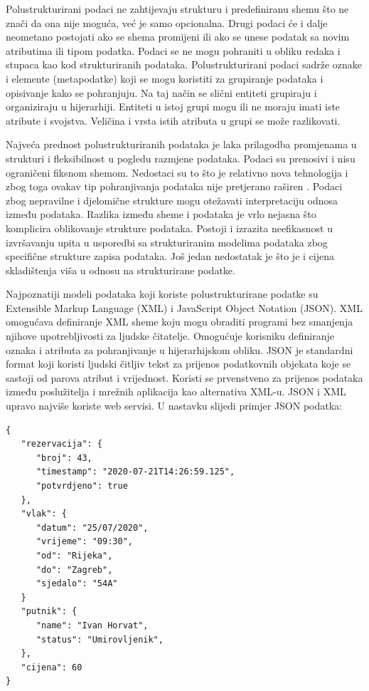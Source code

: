 \documentclass{foi}
\begin{document}
Polustrukturirani podaci ne zahtijevaju strukturu i predefiniranu shemu što ne znači da ona nije moguća, već je samo opcionalna. Drugi podaci će i dalje neometano postojati ako se shema promijeni ili ako se unese podatak sa novim atributima ili tipom podatka. Podaci se ne mogu pohraniti u obliku redaka i stupaca kao kod strukturiranih podataka. Polustrukturirani podaci sadrže oznake i elemente (metapodatke) koji se mogu koristiti za grupiranje podataka i opisivanje kako se pohranjuju. Na taj način se slični entiteti grupiraju i organiziraju u hijerarhiji. Entiteti u istoj grupi mogu ili ne moraju imati iste atribute i svojstva. Veličina i vrsta istih atributa u grupi se može razlikovati.

Najveća prednost polustrukturiranih podataka je laka prilagodba promjenama u strukturi i fleksibilnost u pogledu razmjene podataka. Podaci su prenosivi i nisu ograničeni fiksnom shemom. Nedostaci su to što je relativno nova tehnologija i zbog toga ovakav tip pohranjivanja podataka nije pretjerano raširen \cite{unstructuredStructuredSemiStructured}. Podaci zbog nepravilne i djelomične strukture mogu otežavati interpretaciju odnosa između podataka. Razlika između sheme i podataka je vrlo nejasna što komplicira oblikovanje strukture podataka. Postoji i izrazita neefikasnost u izvršavanju upita u usporedbi sa strukturiranim modelima podataka zbog specifične strukture zapisa podataka. Još jedan nedostatak je što je i cijena skladištenja viša u odnosu na strukturirane podatke. \cite{tbpknjiga}

Najpoznatiji modeli podataka koji koriste polustrukturirane podatke su Extensible Markup Language (XML) i JavaScript Object Notation (JSON). XML omogućava definiranje XML sheme koju mogu obraditi programi bez smanjenja njihove upotrebljivosti za ljudske čitatelje. Omogućuje korisniku definiranje oznaka i atributa za pohranjivanje u hijerarhijskom obliku. JSON je standardni format koji koristi ljudski čitljiv tekst za prijenos podatkovnih objekata koje se sastoji od parova atribut i vrijednost. Koristi se prvenstveno za prijenos podataka između poslužitelja i mrežnih aplikacija kao alternativa XML-u. JSON i XML upravo najviše koriste web servisi. \cite{cros} U nastavku slijedi primjer JSON podatka:

\begin{lstlisting}
{
   "rezervacija": {
      "broj": 43,
      "timestamp": "2020-07-21T14:26:59.125",
      "potvrdjeno": true
   },
   "vlak": {
      "datum": "25/07/2020",
      "vrijeme": "09:30",
      "od": "Rijeka",
      "do": "Zagreb",
      "sjedalo": "54A"
   }
   "putnik": {
      "name": "Ivan Horvat",
      "status": "Umirovljenik",
   },
   "cijena": 60
}
\end{lstlisting}
\end{document}
